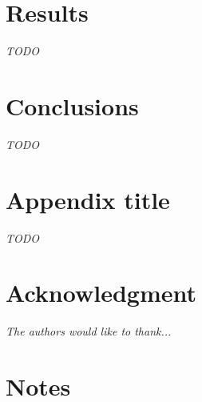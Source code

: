 \documentclass[journal,onecolumn]{IEEEtran}
\begin{document}
%
%
%
\section{Results}

\textit{TODO}


%
%
%
\section{Conclusions}

\textit{TODO}


\appendices
\section{Appendix title}
\textit{TODO}


%
%
%
\section*{Acknowledgment}

\textit{The authors would like to thank...}


%
%
%
\section*{Notes}
\end{document}
